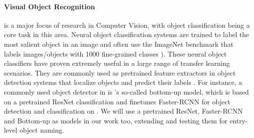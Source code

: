 



\paragraph{Visual Object Recognition} is a major focus of research in Computer Vision, with object classification being a core task in this area. 
Neural object classification systems are trained to label the most salient object in an image and often use the ImageNet \cite{imagenet_cvpr09} benchmark that labels images/objects with 1000 fine-grained classes \cite{googlenet,he2016deep}). 
These neural object classifiers have proven extremely useful in a large range of transfer learning scenarios. They are commonly used as pretrained feature extractors in object detection systems that localize objects and predict their labels \cite{fasterrcnn2015}.
For instance, a commonly used object detector in \lv is \citep{anderson2018updown}'s so-called bottom-up model, which is based on a pretrained ResNet classification and finetunes Faster-RCNN \cite{fasterrcnn2015} for object detection and classification on \vg. 
We will use a pretrained ResNet, Faster-RCNN and Bottom-up as models in our work too, extending and testing them for entry-level object naming. 



